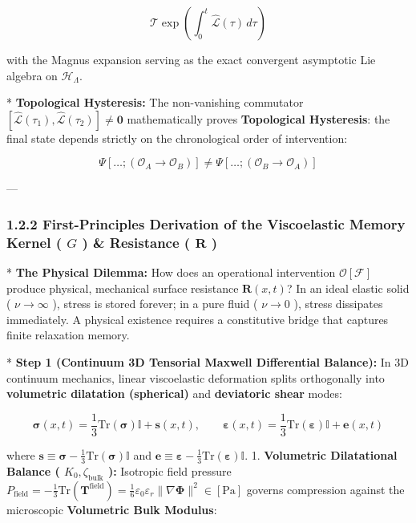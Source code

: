 \documentclass[11pt,a4paper]{article}
\theoremstyle{definition}
\theoremstyle{remark}
\begin{document}
\begin{equation}
\mathcal{T} \exp\left( \int_0^t \hat{\mathcal{L}}(\tau) \, d\tau \right)
\end{equation}


with the Magnus expansion serving as the exact convergent asymptotic Lie algebra on $\mathcal{H}_{\Lambda}$.

* \textbf{Topological Hysteresis:} The non-vanishing commutator $[ \hat{\mathcal{L}}(\tau_1), \hat{\mathcal{L}}(\tau_2) ] \neq \mathbf{0}$ mathematically proves \textbf{Topological Hysteresis}: the final state depends strictly on the chronological order of intervention:


\begin{equation}
\Psi[\dots; (\mathcal{O}_A \to \mathcal{O}_B)] \neq \Psi[\dots; (\mathcal{O}_B \to \mathcal{O}_A)]
\end{equation}


---

\subsubsection{1.2.2 First-Principles Derivation of the Viscoelastic Memory Kernel ( $G$ ) \& Resistance ( $\mathbf{R}$ )}
* \textbf{The Physical Dilemma:} How does an operational intervention $\mathcal{O}[\mathcal{F}]$ produce physical, mechanical surface resistance $\mathbf{R}(x, t)$? In an ideal elastic solid ( $\nu \to \infty$ ), stress is stored forever; in a pure fluid ( $\nu \to 0$ ), stress dissipates immediately. A physical existence requires a constitutive bridge that captures finite relaxation memory.

* \textbf{Step 1 (Continuum 3D Tensorial Maxwell Differential Balance):}
In 3D continuum mechanics, linear viscoelastic deformation splits orthogonally into \textbf{volumetric dilatation (spherical)} and \textbf{deviatoric shear} modes:


\begin{equation}
\boldsymbol{\sigma}(x, t) = \frac{1}{3}\mathrm{Tr}(\boldsymbol{\sigma})\mathbb{I} + \mathbf{s}(x, t), \qquad \boldsymbol{\varepsilon}(x, t) = \frac{1}{3}\mathrm{Tr}(\boldsymbol{\varepsilon})\mathbb{I} + \mathbf{e}(x, t)
\end{equation}


where $\mathbf{s} \equiv \boldsymbol{\sigma} - \frac{1}{3}\mathrm{Tr}(\boldsymbol{\sigma})\mathbb{I}$ and $\mathbf{e} \equiv \boldsymbol{\varepsilon} - \frac{1}{3}\mathrm{Tr}(\boldsymbol{\varepsilon})\mathbb{I}$.
1. \textbf{Volumetric Dilatational Balance ( $K_0, \zeta_{\text{bulk}}$ ):}
Isotropic field pressure $P_{\text{field}} = -\frac{1}{3}\mathrm{Tr}(\mathbf{T}^{\text{field}}) = \frac{1}{6}\varepsilon_0 \varepsilon_r \|\nabla \mathbf{\Phi}\|^2 \in [\mathrm{Pa}]$ governs compression against the microscopic \textbf{Volumetric Bulk Modulus}:
\end{document}

